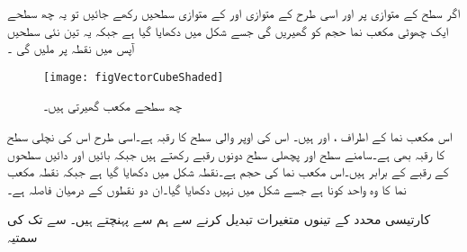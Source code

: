 اگر سطح   کے متوازی  پر اور اسی طرح  کے متوازی  اور  کے متوازی  سطحیں رکھے جائیں تو یہ چھ سطحے ایک چھوٹی  مکعب نما حجم  کو گھیریں گی جسے شکل  میں دکھایا گیا ہے جبکہ یہ تین نئی سطحیں آپس میں نقطہ  پر ملیں گی ۔
\begin{figure}
\centering
\texttt{[image: figVectorCubeShaded]}
\caption{چھ سطحے مکعب گھیرتی ہیں۔}
\label{شکل_سمتیہ_کارتیسی_چھوٹی_مکعب}
\end{figure}
اس مکعب نما کے اطراف ،  اور  ہیں۔ اس کی اوپر والی سطح کا رقبہ  ہے۔اسی طرح اس کی نچلی سطح کا رقبہ بھی  ہے۔سامنے سطح  اور پچھلی سطح دونوں  رقبے رکھتے ہیں جبکہ بائیں  اور دائیں سطحوں کے رقبے  کے برابر ہیں۔اس مکعب نما کی حجم  ہے۔نقطہ  شکل میں دکھایا گیا ہے جبکہ
 نقطہ  مکعب نما کا وہ واحد کونا ہے جسے شکل میں نہیں دکھایا گیا۔ان دو نقطوں کے درمیان فاصلہ  ہے۔ 

کارتیسی محدد کے تینوں متغیرات تبدیل کرنے سے ہم  سے  پہنچتے ہیں۔ سے  تک کی سمتیہ

